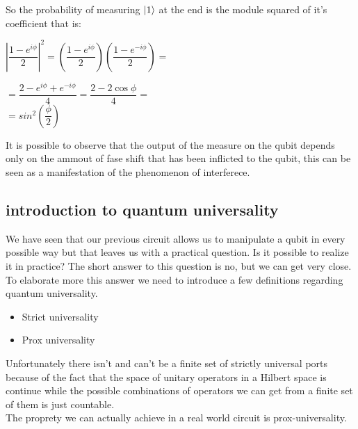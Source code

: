 \documentclass{article}
\begin{document}
So the probability of measuring $\ket{1}$ at the end is the module squared of it's\\
coefficient that is:\\
\vspace{10pt}

$\left|\dfrac{1-e^{i\phi}}{2}\right|^2 = \left(\dfrac{1-e^{i\phi}}{2}\right)\left(\dfrac{1-e^{-i\phi}}{2}\right) =$\\
\vspace{5pt}


$ = \dfrac{2-e^{i\phi}+e^{-i\phi}}{4} = \dfrac{2-2\cos{\phi}}{4} =$\\

\vspace{3pt}
$ = sin^2{\left(\dfrac{\phi}{2}\right)}$

\vspace{10pt}



It is possible to observe that the output of the measure on the qubit
depends only on the ammout of fase shift that has been inflicted
to the qubit, this can be seen as a manifestation of the phenomenon
of interferece.



\subsection{introduction to quantum universality}

We have seen that our previous circuit allows us to manipulate a qubit
in every possible way but that leaves us with a practical question.
Is it possible to realize it in practice?
The short answer to this question is no, but we can get very close.
To elaborate more this answer we need to introduce a few definitions
regarding quantum universality.
\begin{itemize}

	\item
	      Strict universality

	\item
	      Prox universality

\end{itemize}

Unfortunately there isn't and can't be a finite set of strictly
universal
ports because of the fact that the space of unitary operators in a
Hilbert space is continue while the possible combinations of
operators we can get from a finite set of them is just countable.\\
The proprety we can actually achieve in a real world circuit is
prox-universality.\\
\end{document}
